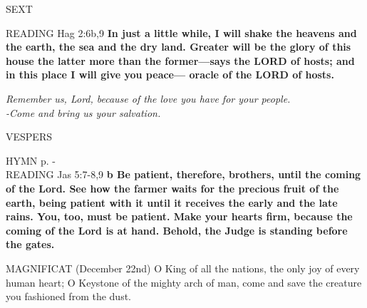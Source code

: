 \begin{flushleft}\normalsize{\uppercase{Sext\\}}\end{flushleft}
\noindent\small{\uppercase{Reading}} Hag 2:6b,9 \textbf{ In just a little while, I will shake the heavens and the earth, the sea and the dry land. Greater will be the glory of this house the latter more than the former—says the LORD of hosts; and in this place I will give you peace— oracle of the LORD of hosts.\\}
\begin{center}\textit{Remember us, Lord, because of the love you have for your people.\\
-Come and bring us your salvation.}\end{center}
                                   
\begin{flushleft}\normalsize{\uppercase{Vespers\\}}\end{flushleft}
\small{\uppercase{Hymn} p. \pageref{advent:firstHymn}-\pageref{advent:lastHymn}\\}
\noindent\small{\uppercase{Reading}} Jas 5:7-8,9 \textbf{b Be patient, therefore, brothers, until the coming of the Lord. See how the farmer waits for the precious fruit of the earth, being patient with it until it receives the early and the late rains. You, too, must be patient. Make your hearts firm, because the coming of the Lord is at hand. Behold, the Judge is standing before the gates.\\}

\noindent\small{\uppercase{Magnificat}} (December 22nd)
O King of all the nations, the only joy of every human heart; O Keystone of the mighty arch of man, come and save the creature you fashioned from the dust.
